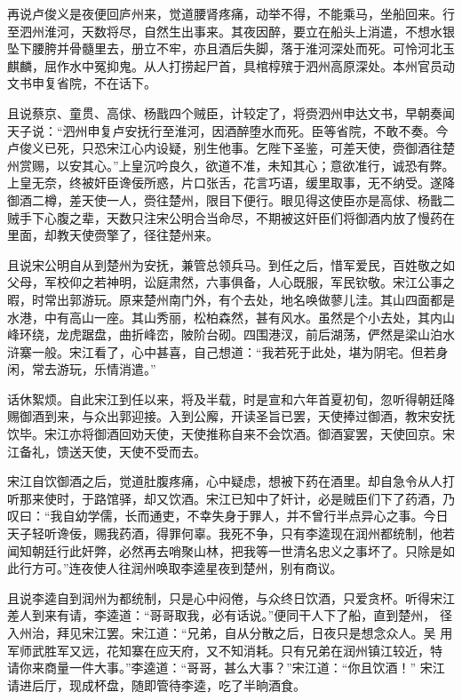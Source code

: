再说卢俊义是夜便回庐州来，觉道腰肾疼痛，动举不得，不能乘马，坐船回来。行
至泗州淮河，天数将尽，自然生出事来。其夜因醉，要立在船头上消遣，不想水银
坠下腰胯并骨髓里去，册立不牢，亦且酒后失脚，落于淮河深处而死。可怜河北玉
麒麟，屈作水中冤抑鬼。从人打捞起尸首，具棺椁殡于泗州高原深处。本州官员动
文书申复省院，不在话下。

且说蔡京、童贯、高俅、杨戬四个贼臣，计较定了，将赍泗州申达文书，早朝奏闻
天子说：“泗州申复卢安抚行至淮河，因酒醉堕水而死。臣等省院，不敢不奏。今
卢俊义已死，只恐宋江心内设疑，别生他事。乞陛下圣鉴，可差天使，赍御酒往楚
州赏赐，以安其心。”上皇沉吟良久，欲道不准，未知其心；意欲准行，诚恐有弊。
上皇无奈，终被奸臣谗佞所惑，片口张舌，花言巧语，缓里取事，无不纳受。遂降
御酒二樽，差天使一人，赍往楚州，限目下便行。眼见得这使臣亦是高俅、杨戬二
贼手下心腹之辈，天数只注宋公明合当命尽，不期被这奸臣们将御酒内放了慢药在
里面，却教天使赍擎了，径往楚州来。

且说宋公明自从到楚州为安抚，兼管总领兵马。到任之后，惜军爱民，百姓敬之如
父母，军校仰之若神明，讼庭肃然，六事俱备，人心既服，军民钦敬。宋江公事之
暇，时常出郭游玩。原来楚州南门外，有个去处，地名唤做蓼儿洼。其山四面都是
水港，中有高山一座。其山秀丽，松柏森然，甚有风水。虽然是个小去处，其内山
峰环绕，龙虎踞盘，曲折峰峦，陂阶台砌。四围港汊，前后湖荡，俨然是梁山泊水
浒寨一般。宋江看了，心中甚喜，自己想道：“我若死于此处，堪为阴宅。但若身
闲，常去游玩，乐情消遣。”

话休絮烦。自此宋江到任以来，将及半载，时是宣和六年首夏初旬，忽听得朝廷降
赐御酒到来，与众出郭迎接。入到公廨，开读圣旨已罢，天使捧过御酒，教宋安抚
饮毕。宋江亦将御酒回劝天使，天使推称自来不会饮酒。御酒宴罢，天使回京。宋
江备礼，馈送天使，天使不受而去。

宋江自饮御酒之后，觉道肚腹疼痛，心中疑虑，想被下药在酒里。却自急令从人打
听那来使时，于路馆驿，却又饮酒。宋江已知中了奸计，必是贼臣们下了药酒，乃
叹曰：“我自幼学儒，长而通吏，不幸失身于罪人，并不曾行半点异心之事。今日
天子轻听谗佞，赐我药酒，得罪何辜。我死不争，只有李逵现在润州都统制，他若
闻知朝廷行此奸弊，必然再去哨聚山林，把我等一世清名忠义之事坏了。只除是如
此行方可。”连夜使人往润州唤取李逵星夜到楚州，别有商议。

且说李逵自到润州为都统制，只是心中闷倦，与众终日饮酒，只爱贪杯。听得宋江
差人到来有请，李逵道：“哥哥取我，必有话说。”便同干人下了船，直到楚州，
径入州治，拜见宋江罢。宋江道：“兄弟，自从分散之后，日夜只是想念众人。吴
用军师武胜军又远，花知寨在应天府，又不知消耗。只有兄弟在润州镇江较近，特
请你来商量一件大事。”李逵道：“哥哥，甚么大事？”宋江道：“你且饮酒！”
宋江请进后厅，现成杯盘，随即管待李逵，吃了半晌酒食。

